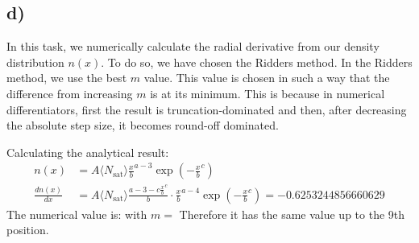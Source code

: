 \subsection*{d)}
In this task, we numerically calculate the radial derivative from our density distribution \( n(x) \). To do so, we have chosen the Ridders method. In the Ridders method, we use the best \( m \) value. This value is chosen in such a way that the difference from increasing \( m \) is at its minimum. This is because in numerical differentiators, first the result is truncation-dominated and then, after decreasing the absolute step size, it becomes round-off dominated.

Calculating the analytical result:
\begin{align}
    n(x) &= A \langle N_{\text{sat}} \rangle \frac{x}{b}^{a-3}\exp\left(-\frac{x}{b}^c\right) \\
    \frac{dn(x)}{dx} &= A \langle N_{\text{sat}} \rangle \frac{a-3-c\frac{x}{b}^{c}}{b} \cdot \frac{x}{b}^{a-4} \exp\left(-\frac{x}{b}^c\right) = -0.6253244856660629
\end{align}
The numerical value is:  with \( m = \)  
Therefore it has the same value up to the 9th position. 


